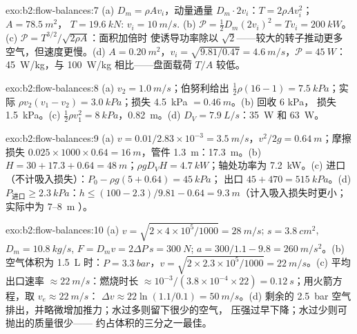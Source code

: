 \begin{solution}{exo:b2:flow-balances:7}
(a) $D_m = \rho Av_i$，动量通量 $D_m\cdot2v_i$：$T = 2\rho Av_i^2$；$A = \qty{78.5}{m^2}$，
$T = \qty{19.6}{kN}$: $v_i = \qty{10}{m/s}$. (b) $\mathcal P = \tfrac12D_m(2v_i)^2 = Tv_i =
\qty{200}{kW}$。(c) $\mathcal P = T^{3/2}/\sqrt{2\rho A}$：面积加倍时
使诱导功率除以 $\sqrt2$——较大的转子推动更多
空气，但速度更慢。(d) $A = \qty{0.20}{m^2}$，$v_i = \sqrt{9.81/0.47} = \qty{4.6}{m/s}$，$\mathcal P
= \qty{45}{W}$：\qty{45}{W/kg}，与 \qty{100}{W/kg} 相比——盘面载荷 $T/A$
较低。
\end{solution}

\begin{solution}{exo:b2:flow-balances:8}
(a) $v_2 = \qty{1.0}{m/s}$；伯努利给出 $\tfrac12\rho(16 - 1) = \qty{7.5}{kPa}$；实际
$\rho v_2(v_1 - v_2) = \qty{3.0}{kPa}$；损失 \qty{4.5}{kPa} $= \qty{0.46}{m}$。(b) 回收 $6$ kPa，
损失 \qty{1.5}{kPa}。(c) $\tfrac12\rho v_1^2 = \qty{8}{kPa}$，\qty{0.82}{m}。(d)
$D_V = \qty{7.9}{L/s}$：\qty{35}{W} 和 \qty{63}{W}。
\end{solution}

\begin{solution}{exo:b2:flow-balances:9}
(a) $v = 0.01/2.83 \times 10^{-3} = \qty{3.5}{m/s}$，$v^2/2g = \qty{0.64}{m}$；摩擦损失
$0.025 \times 1000 \times 0.64 = \qty{16}{m}$，管件 \qty{1.3}{m}：\qty{17.3}{m}。(b)
$H = 30 + 17.3 + 0.64 = \qty{48}{m}$；$\rho gD_VH = \qty{4.7}{kW}$；轴处功率为
\qty{7.2}{kW}。(c) 进口（不计吸入损失）：$P_0 - \rho g(5 + 0.64) = \qty{45}{kPa}$；
出口 $45 + 470 = \qty{515}{kPa}$。(d) $P_{\text{进口}} \ge \qty{2.3}{kPa}$：$h \le (100 -
2.3)/9.81 - 0.64 = \qty{9.3}{m}$（计入吸入损失时更小；实际中为 $7$--\qty{8}{m}
）。
\end{solution}

\begin{solution}{exo:b2:flow-balances:10}
(a) $v = \sqrt{2 \times 4 \times 10^5/1000} = \qty{28}{m/s}$; $s = \qty{3.8}{cm^2}$, $D_m =
\qty{10.8}{kg/s}$, $F = D_mv = 2\Delta P\,s = \qty{300}{N}$; $a = 300/1.1 - 9.8 =
\qty{260}{m/s^2}$。(b) 空气体积为 \qty{1.5}{L} 时：$P = \qty{3.3}{bar}$，$v = \sqrt{2 \times 2.3 \times
10^5/1000} = \qty{22}{m/s}$。(c) 平均出口速率 $\approx \qty{22}{m/s}$：燃烧时长 $\approx 10^{-3}
/(3.8 \times 10^{-4} \times 22) = \qty{0.12}{s}$；用火箭方程，取 $v_e \approx \qty{22}{m/s}$：
$\Delta v \approx 22\ln(1.1/0.1) = \qty{50}{m/s}$。(d) 剩余的 \qty{2.5}{bar} 空气
排出，并略微增加推力；水过多则留下很少的空气，
压强过早下降；水过少则可抛出的质量很少——
约占体积的三分之一最佳。
\end{solution}

